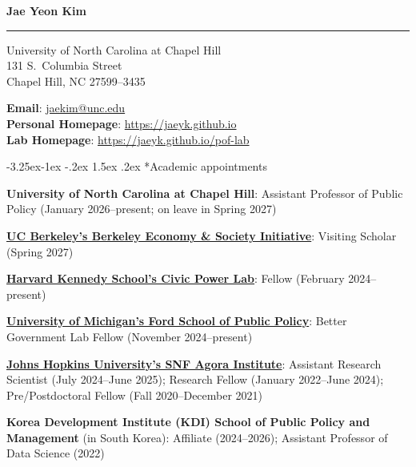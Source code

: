 \documentclass[10pt, letterpaper]{article}
\makeatletter
\def\name{Jae Yeon Kim}
\renewcommand\subsection{\@startsection{subsection}{2}{\z@}%
  {-3.25ex\@plus -1ex \@minus -.2ex}%
  {1.5ex \@plus .2ex}%
  {\normalfont\large\bfseries\color{cvnavy}}}
\makeatother
\begin{document}
\raggedright{}\relax

\textbf{{\Large\color{cvnavy}\name}}

\vspace{0.00001in} %
{\color{cvnavy}\noindent\rule{\linewidth}{0.4pt}} %


\begin{minipage}[t]{0.48\linewidth}
\raggedright
University of North Carolina at Chapel Hill\\
131 S.\ Columbia Street \\
Chapel Hill, NC 27599--3435\\
\end{minipage}
\hfill
\begin{minipage}[t]{0.48\linewidth}
\raggedright
\textbf{Email}: \href{mailto:jaekim@unc.edu}{jaekim@unc.edu}\\
[0.2em]
\textbf{Personal Homepage}: \url{https://jaeyk.github.io}\\
[0.2em]
\textbf{Lab Homepage}: \url{https://jaeyk.github.io/pof-lab}
\end{minipage}

\subsection*{Academic appointments}

\begin{description}[font=\mdseries]

\item \textbf{University of North Carolina at Chapel Hill}: Assistant Professor of Public Policy (January 2026--present; on leave in Spring 2027)

\item \href{https://besi.berkeley.edu/}{\textbf{UC Berkeley's Berkeley Economy \& Society Initiative}}: Visiting Scholar (Spring 2027)

\item \href{https://civicpowerlab.us/}{\textbf{Harvard Kennedy School's Civic Power Lab}}: Fellow (February 2024--present)

\item \href{https://www.bettergovernmentlab.org/}{\textbf{University of Michigan's Ford School of Public Policy}}: Better Government Lab Fellow (November 2024--present)

\item \href{https://snfagora.jhu.edu/}{\textbf{Johns Hopkins University's SNF Agora Institute}}: Assistant Research Scientist (July 2024--June 2025); Research Fellow (January 2022--June 2024); Pre/Postdoctoral Fellow (Fall 2020--December 2021)

\item \textbf{Korea Development Institute (KDI) School of Public Policy and Management} (in South Korea): Affiliate (2024--2026); Assistant Professor of Data Science (2022)

\end{description}
\end{document}

